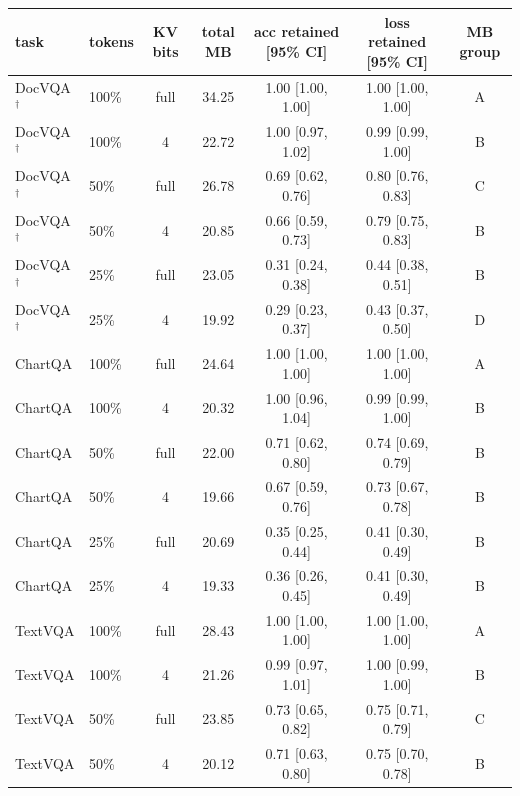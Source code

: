 \begin{tabular}{llcccc c}
\toprule
task & tokens & KV bits & total MB & acc retained [95\% CI] & loss retained [95\% CI] & MB group \\
\midrule
DocVQA$^\dagger$ & 100\% & full & 34.25 & 1.00 {\scriptsize[1.00, 1.00]} & 1.00 {\scriptsize[1.00, 1.00]} & A \\
DocVQA$^\dagger$ & 100\% & 4 & 22.72 & 1.00 {\scriptsize[0.97, 1.02]} & 0.99 {\scriptsize[0.99, 1.00]} & B \\
DocVQA$^\dagger$ & 50\% & full & 26.78 & 0.69 {\scriptsize[0.62, 0.76]} & 0.80 {\scriptsize[0.76, 0.83]} & C \\
DocVQA$^\dagger$ & 50\% & 4 & 20.85 & 0.66 {\scriptsize[0.59, 0.73]} & 0.79 {\scriptsize[0.75, 0.83]} & B \\
DocVQA$^\dagger$ & 25\% & full & 23.05 & 0.31 {\scriptsize[0.24, 0.38]} & 0.44 {\scriptsize[0.38, 0.51]} & B \\
DocVQA$^\dagger$ & 25\% & 4 & 19.92 & 0.29 {\scriptsize[0.23, 0.37]} & 0.43 {\scriptsize[0.37, 0.50]} & D \\
\midrule
ChartQA & 100\% & full & 24.64 & 1.00 {\scriptsize[1.00, 1.00]} & 1.00 {\scriptsize[1.00, 1.00]} & A \\
ChartQA & 100\% & 4 & 20.32 & 1.00 {\scriptsize[0.96, 1.04]} & 0.99 {\scriptsize[0.99, 1.00]} & B \\
ChartQA & 50\% & full & 22.00 & 0.71 {\scriptsize[0.62, 0.80]} & 0.74 {\scriptsize[0.69, 0.79]} & B \\
ChartQA & 50\% & 4 & 19.66 & 0.67 {\scriptsize[0.59, 0.76]} & 0.73 {\scriptsize[0.67, 0.78]} & B \\
ChartQA & 25\% & full & 20.69 & 0.35 {\scriptsize[0.25, 0.44]} & 0.41 {\scriptsize[0.30, 0.49]} & B \\
ChartQA & 25\% & 4 & 19.33 & 0.36 {\scriptsize[0.26, 0.45]} & 0.41 {\scriptsize[0.30, 0.49]} & B \\
\midrule
TextVQA & 100\% & full & 28.43 & 1.00 {\scriptsize[1.00, 1.00]} & 1.00 {\scriptsize[1.00, 1.00]} & A \\
TextVQA & 100\% & 4 & 21.26 & 0.99 {\scriptsize[0.97, 1.01]} & 1.00 {\scriptsize[0.99, 1.00]} & B \\
TextVQA & 50\% & full & 23.85 & 0.73 {\scriptsize[0.65, 0.82]} & 0.75 {\scriptsize[0.71, 0.79]} & C \\
TextVQA & 50\% & 4 & 20.12 & 0.71 {\scriptsize[0.63, 0.80]} & 0.75 {\scriptsize[0.70, 0.78]} & B \\

\end{tabular}
